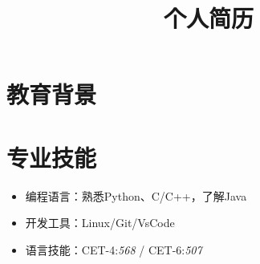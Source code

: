 \documentclass[10pt,a4paper,sans]{moderncv} %
\title{个人简历}
\begin{document}
\makecvtitle %



\section{教育背景}




\section{专业技能}
\begin{itemize}
\setlength{\itemindent}{2em}
   \item 编程语言：熟悉Python、C/C++，了解Java
  	\item 开发工具：Linux/Git/VsCode
  	\item 语言技能：CET-4:\textit{568} / CET-6:\textit{507}
\end{itemize}

\end{document}

